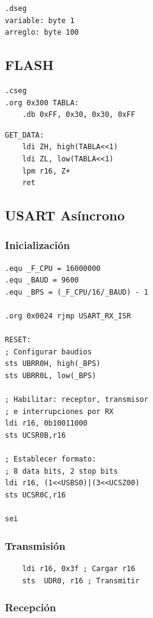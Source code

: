 \begin{verbatim}
.dseg
variable: byte 1  
arreglo: byte 100
\end{verbatim}


\subsection{FLASH}

\begin{verbatim}
.cseg
.org 0x300 TABLA:
    .db 0xFF, 0x30, 0x30, 0xFF
\end{verbatim}

\begin{verbatim}
GET_DATA:
    ldi ZH, high(TABLA<<1)
    ldi ZL, low(TABLA<<1)
    lpm r16, Z+
    ret
\end{verbatim}


\subsection{USART Asíncrono}
    \subsubsection{Inicialización}
    \begin{verbatim}
.equ _F_CPU = 16000000
.equ _BAUD = 9600
.equ _BPS = (_F_CPU/16/_BAUD) - 1

.org 0x0024 rjmp USART_RX_ISR

RESET:
; Configurar baudios
sts UBRR0H, high(_BPS)
sts UBRR0L, low(_BPS)

; Habilitar: receptor, transmisor
; e interrupciones por RX
ldi r16, 0b10011000
sts UCSR0B,r16

; Establecer formato:
; 8 data bits, 2 stop bits
ldi r16, (1<<USBS0)|(3<<UCSZ00)
sts UCSR0C,r16

sei
    \end{verbatim}
    \subsubsection{Transmisión}
    \begin{verbatim}
    ldi r16, 0x3f ; Cargar r16 
    sts  UDR0, r16 ; Transmitir
    \end{verbatim}
    \subsubsection{Recepción}

